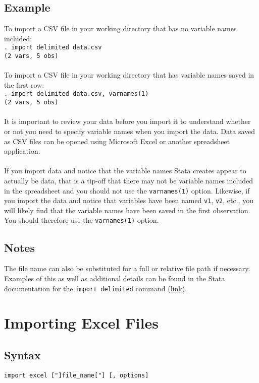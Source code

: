\documentclass[letterpaper,11pt]{article}
\begin{document}
\subsection{Example}
To import a CSV file in your working directory that has no variable names included: \\
\texttt{. {\color{Red}import delimited} data.csv}  \\
\texttt{(2 vars, 5 obs)}\\
\\
To import a CSV file in your working directory that has variable names saved in the first row: \\
\texttt{. {\color{Red}import delimited} data.csv, varnames(1)}  \\
\texttt{(2 vars, 5 obs)} \\
\\
It is important to review your data before you import it to understand whether or not you need to specify variable names when you import the data. Data saved as CSV files can be opened using Microsoft Excel or another spreadsheet application. \\
\\
If you import data and notice that the variable names Stata creates appear to actually be data, that is a tip-off that there may not be variable names included in the spreadsheet and you should not use the \texttt{varnames(1)} option. Likewise, if you import the data and notice that variables have been named \texttt{v1}, \texttt{v2}, etc., you will likely find that the variable names have been saved in the first observation. You should therefore use the \texttt{varnames(1)} option.\\

\subsection{Notes}
The file name can also be substituted for a full or relative file path if necessary. Examples of this as well as additional details can be found in the Stata documentation for the \texttt{{\color{Red}import delimited}} command (\href{http://www.stata.com/manuals14/dimportdelimited.pdf}{link}).\\
\newpage
\section{Importing Excel Files}
\subsection{Syntax}
\texttt{{\color{Red}import excel} ["]file\_name["] [, options]}\\
\end{document}
